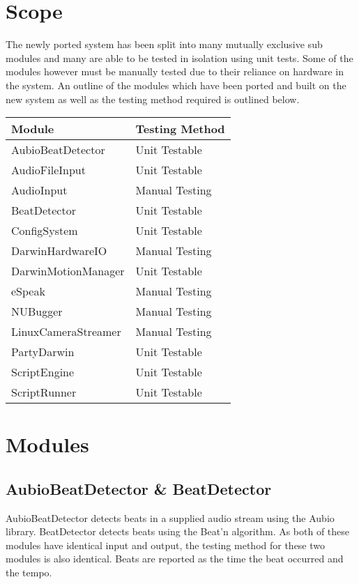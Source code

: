 \documentclass[english,12pt]{scrartcl}
\begin{document}
\section{Scope}
	The newly ported system has been split into many mutually exclusive sub modules and many are able to be tested in isolation using unit tests.
	Some of the modules however	must be manually tested due to their reliance on hardware in the system.
	An outline of the modules which have been ported and built on the new system as well as the testing method required is outlined below.
	\begin{tabular}{|p{7cm}|p{7cm}|}
		\hline \textbf{\large Module} & \textbf{\large Testing Method} \\ \hline
		AubioBeatDetector     & Unit Testable    \\ \hline
		AudioFileInput        & Unit Testable    \\ \hline
		AudioInput            & Manual Testing   \\ \hline
		BeatDetector          & Unit Testable    \\ \hline
		ConfigSystem          & Unit Testable    \\ \hline
		DarwinHardwareIO      & Manual Testing   \\ \hline
		DarwinMotionManager   & Unit Testable    \\ \hline
		eSpeak                & Manual Testing   \\ \hline
		NUBugger              & Manual Testing   \\ \hline
		LinuxCameraStreamer   & Manual Testing   \\ \hline
		PartyDarwin           & Unit Testable    \\ \hline
		ScriptEngine          & Unit Testable    \\ \hline
		ScriptRunner          & Unit Testable    \\ \hline
	\end{tabular}
	
\section{Modules}
	\subsection{AubioBeatDetector \& BeatDetector}
		AubioBeatDetector detects beats in a supplied audio stream using the Aubio library.
		BeatDetector detects beats using the Beat'n algorithm.
		As both of these modules have identical input and output, the testing method for these two modules is also identical.
		Beats are reported as the time the beat occurred and the tempo.
		
\end{document}
